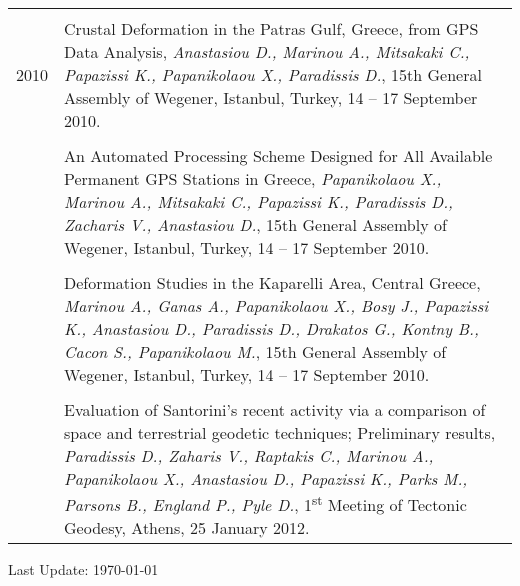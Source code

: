 \documentclass[a4paper,10pt]{article} %
\begin{document}
\begin{longtable}{r|p{14cm}}
\multicolumn{2}{c}{} \\
  \textsc{2010}
  & Crustal Deformation in the Patras Gulf, Greece, from GPS Data Analysis,
  \emph{Anastasiou D., Marinou A., Mitsakaki C., Papazissi K., Papanikolaou X., Paradissis D.},
  15th General Assembly of Wegener, Istanbul, Turkey, 14 – 17 September 2010.\\

  &\\

  & An Automated Processing Scheme Designed for All Available Permanent GPS Stations in Greece,
  \emph{Papanikolaou X., Marinou A., Mitsakaki C., Papazissi K., Paradissis D., Zacharis V., Anastasiou D.},
  15th General Assembly of Wegener, Istanbul, Turkey, 14 – 17 September 2010.\\

  &\\

  & Deformation Studies in the Kaparelli Area, Central Greece,
  \emph{Marinou A., Ganas A., Papanikolaou X., Bosy J., Papazissi K., Anastasiou D., Paradissis D., Drakatos G., Kontny B., Cacon S., Papanikolaou M.},
  15th General Assembly of Wegener, Istanbul, Turkey, 14 – 17 September 2010.\\

  &\\

  & Evaluation of Santorini's recent activity via a comparison of space and terrestrial geodetic techniques; Preliminary results,
  \emph{Paradissis D., Zaharis V., Raptakis C., Marinou A., Papanikolaou X., Anastasiou D., Papazissi K., Parks M., Parsons B., England P., Pyle D.},
  1\textsuperscript{st} Meeting of Tectonic Geodesy, Athens, 25 January 2012.\\

\end{longtable}



\vfill
\begin{center}
  \begin{footnotesize}
    Last Update: \today
  \end{footnotesize}
\end{center}
\end{document}
